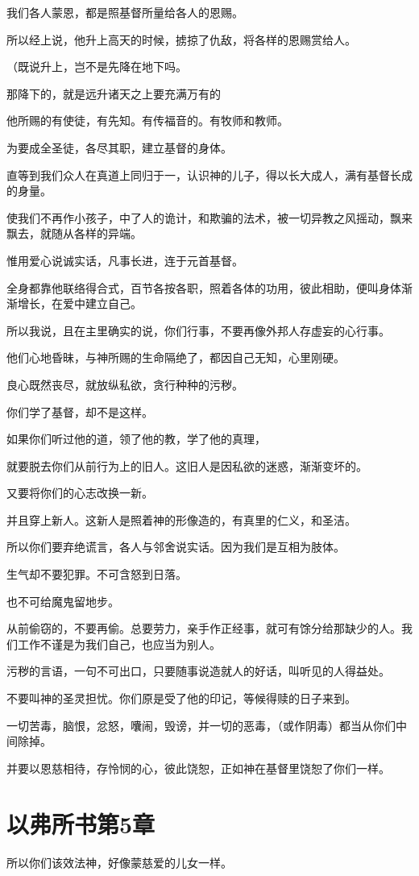 \documentclass[12pt,oneside]{book}
\begin{document}
我们各人蒙恩，都是照基督所量给各人的恩赐。

所以经上说，他升上高天的时候，掳掠了仇敌，将各样的恩赐赏给人。

（既说升上，岂不是先降在地下吗。

那降下的，就是远升诸天之上要充满万有的

他所赐的有使徒，有先知。有传福音的。有牧师和教师。

为要成全圣徒，各尽其职，建立基督的身体。

直等到我们众人在真道上同归于一，认识神的儿子，得以长大成人，满有基督长成的身量。

使我们不再作小孩子，中了人的诡计，和欺骗的法术，被一切异教之风摇动，飘来飘去，就随从各样的异端。

惟用爱心说诚实话，凡事长进，连于元首基督。

全身都靠他联络得合式，百节各按各职，照着各体的功用，彼此相助，便叫身体渐渐增长，在爱中建立自己。

所以我说，且在主里确实的说，你们行事，不要再像外邦人存虚妄的心行事。

他们心地昏昧，与神所赐的生命隔绝了，都因自己无知，心里刚硬。

良心既然丧尽，就放纵私欲，贪行种种的污秽。

你们学了基督，却不是这样。

如果你们听过他的道，领了他的教，学了他的真理，

就要脱去你们从前行为上的旧人。这旧人是因私欲的迷惑，渐渐变坏的。

又要将你们的心志改换一新。

并且穿上新人。这新人是照着神的形像造的，有真里的仁义，和圣洁。

所以你们要弃绝谎言，各人与邻舍说实话。因为我们是互相为肢体。

生气却不要犯罪。不可含怒到日落。

也不可给魔鬼留地步。

从前偷窃的，不要再偷。总要劳力，亲手作正经事，就可有馀分给那缺少的人。我们工作不谨是为我们自己，也应当为别人。

污秽的言语，一句不可出口，只要随事说造就人的好话，叫听见的人得益处。

不要叫神的圣灵担忧。你们原是受了他的印记，等候得赎的日子来到。

一切苦毒，脑恨，忿怒，囔闹，毁谤，并一切的恶毒，（或作阴毒）都当从你们中间除掉。

并要以恩慈相待，存怜悯的心，彼此饶恕，正如神在基督里饶恕了你们一样。

\chapter{以弗所书第5章}
所以你们该效法神，好像蒙慈爱的儿女一样。
\end{document}
